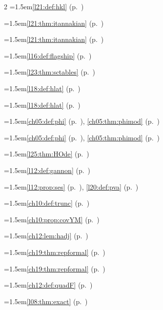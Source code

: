 \begin{multicols}{2}
\hangindent=1.5em\quad \ref{l21:def:hkl} (p.~\pageref{l21:def:hkl})\par
\hangindent=1.5em\quad \ref{l21:thm:itannakian} (p.~\pageref{l21:thm:itannakian})\par
\hangindent=1.5em\quad \ref{l21:thm:itannakian} (p.~\pageref{l21:thm:itannakian})\par
\hangindent=1.5em\quad \ref{l16:def:flagship} (p.~\pageref{l16:def:flagship})\par
\hangindent=1.5em\quad \ref{l23:thm:sctables} (p.~\pageref{l23:thm:sctables})\par
\hangindent=1.5em\quad \ref{l18:def:hlat} (p.~\pageref{l18:def:hlat})\par
\hangindent=1.5em\quad \ref{l18:def:hlat} (p.~\pageref{l18:def:hlat})\par
\hangindent=1.5em\quad \ref{ch05:def:phi} (p.~\pageref{ch05:def:phi}), \ref{ch05:thm:phimod} (p.~\pageref{ch05:thm:phimod})\par
\hangindent=1.5em\quad \ref{ch05:def:phi} (p.~\pageref{ch05:def:phi}), \ref{ch05:thm:phimod} (p.~\pageref{ch05:thm:phimod})\par
\hangindent=1.5em\quad \ref{l25:thm:HOde} (p.~\pageref{l25:thm:HOde})\par
\hangindent=1.5em\quad \ref{l12:def:gannon} (p.~\pageref{l12:def:gannon})\par
\hangindent=1.5em\quad \ref{l12:prop:ses} (p.~\pageref{l12:prop:ses}), \ref{l20:def:pva} (p.~\pageref{l20:def:pva})\par
\hangindent=1.5em\quad \ref{ch10:def:trunc} (p.~\pageref{ch10:def:trunc})\par
\hangindent=1.5em\quad \ref{ch10:prop:covYM} (p.~\pageref{ch10:prop:covYM})\par
\hangindent=1.5em\quad \ref{ch12:lem:hadj} (p.~\pageref{ch12:lem:hadj})\par
\hangindent=1.5em\quad \ref{ch19:thm:repformal} (p.~\pageref{ch19:thm:repformal})\par
\hangindent=1.5em\quad \ref{ch19:thm:repformal} (p.~\pageref{ch19:thm:repformal})\par
\hangindent=1.5em\quad \ref{ch12:def:quadF} (p.~\pageref{ch12:def:quadF})\par
\hangindent=1.5em\quad \ref{l08:thm:exact} (p.~\pageref{l08:thm:exact})\par

\end{multicols}
